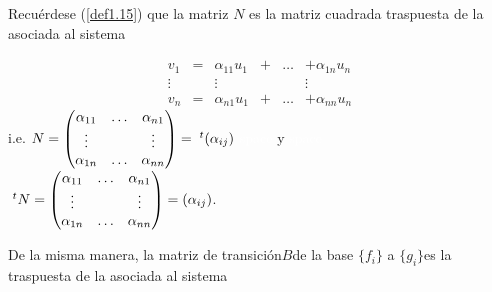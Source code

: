 		\begin{demo}
			\normalfont Recuérdese (\ref{def1.15}) que la matriz $ N $ es la matriz cuadrada traspuesta de la asociada al sistema
			
		\[ 	 \begin{matrix}
			v_{1}  & = & \alpha_{11}u_{1} & + & \ldots & + \alpha_{1n}u_{n} \\ \vdots &   &               \vdots        &     &               & \vdots \\
			v_{n}  & = & \alpha_{n1}u_{1} & + & \ldots & + \alpha_{nn}u_{n}
			\end{matrix}  \]
			  i.e. $ N = \left(\begin{matrix}
			  \alpha_{11} & \ldots &\alpha_{n1} \\ \vdots & & \vdots \\ \alpha_{1n} & \ldots &\alpha_{nn} 
			  \end{matrix}\right) = \textcolor{white}{.}^{t}(\alpha_{ij}) $ \textcolor{white}{space} y \textcolor{white}{space} $ \textcolor{white}{.}^{t}N = \left(\begin{matrix}
			  \alpha_{11} & \ldots &\alpha_{n1} \\ \vdots & & \vdots \\ \alpha_{1n} & \ldots &\alpha_{nn} 
			  \end{matrix}\right) = (\alpha_{ij}) $.
			
			De la misma manera, la matriz de transición$  B  $de la base $ \{f_{i}\} $ a $ \{g_{i}\}  $es la traspuesta de la asociada al sistema
			
		\end{demo}